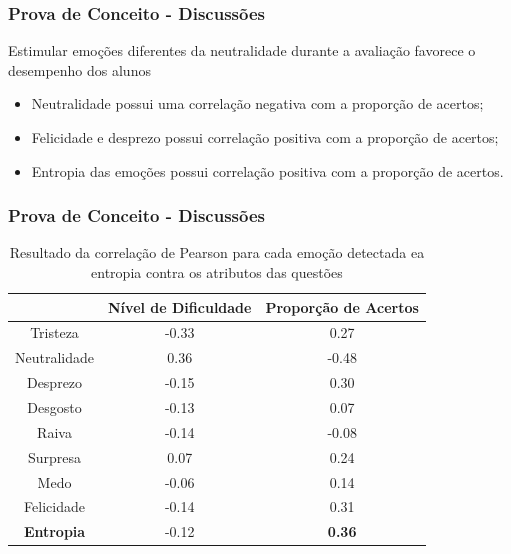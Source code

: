 \documentclass{beamer}
\begin{document}
\begin{frame}
\frametitle{Prova de Conceito - Discussões}
\begin{block}{Estimular emo\c{c}\~oes diferentes da neutralidade durante a avalia\c{c}\~ao favorece o desempenho dos alunos}
\begin{itemize}
\item Neutralidade possui uma correla\c{c}\~ao negativa com a propor\c{c}\~ao de acertos;
\item Felicidade e desprezo possui correla\c{c}\~ao positiva com a propor\c{c}\~ao de acertos;
\pause
\item Entropia das emo\c{c}\~oes possui correla\c{c}\~ao positiva com a propor\c{c}\~ao de acertos.
\end{itemize}
\end{block}

\end{frame}

\begin{frame}
\frametitle{Prova de Conceito - Discussões}
\begin{table}[]\footnotesize
\centering
\caption{Resultado​ ​da​ ​correla\c{c}\~ao​ ​de​ ​Pearson​ ​para​ ​cada​ ​emo\c{c}\~ao​ ​detectada
e​ ​a​ ​entropia​ ​contra​ ​os​ ​atributos​ ​das​ ​quest\~oes}
\label{my-label}
\begin{tabular}{|c|c|c|}
\hline
                      & \textbf{Nível de Dificuldade} & \textbf{Proporção de Acertos} \\ \hline
Tristeza	     & -0.33                & 0.27                          \\ \hline
Neutralidade & 0.36                 & -0.48                \\ \hline
Desprezo     		& -0.15                         & 0.30                 \\ \hline
Desgosto              & -0.13                         & 0.07                          \\ \hline
Raiva                 & -0.14                         & -0.08                         \\ \hline
Surpresa              & 0.07                          & 0.24                          \\ \hline
Medo                  & -0.06                         & 0.14                          \\ \hline
Felicidade   		& -0.14                         & 0.31                 \\ \hline
\small \textbf{Entropia}     		& -0.12                         & \small \textbf{0.36}                 \\ \hline
\end{tabular}
\end{table}
\end{frame}
\end{document}
